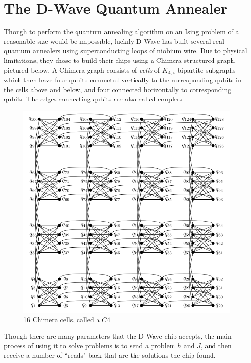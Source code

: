 \documentclass[11pt]{report}
\newcommand{\?}{\stackrel{?}{=}}
\begin{document}
\section{The D-Wave Quantum Annealer}

Though to perform the quantum annealing algorithm on an Ising problem of a reasonable size would be impossible, luckily D-Wave has built several real quantum annealers using superconducting loops of niobium wire. Due to physical limitations, they chose to build their chips using a Chimera structured graph, pictured below. A Chimera graph consists of \textit{cells} of $K_{4,4}$ bipartite subgraphs which then have four qubits connected vertically to the corresponding qubits in the cells above and below, and four connected horizontally to corresponding qubits. The edges connecting qubits are also called couplers. 

\begin{figure}[h!]
  \centerline{\includegraphics[width=\linewidth/2]{resources/images/chimera.png}}
  \caption{16 Chimera cells, called a $C4$}
  \label{fig:boat1}
\end{figure}

Though there are many parameters that the D-Wave chip accepts, the main process of using it to solve problems is to send a problem $h$ and $J$, and then receive a number of ``reads" back that are the solutions the chip found.
\end{document}
